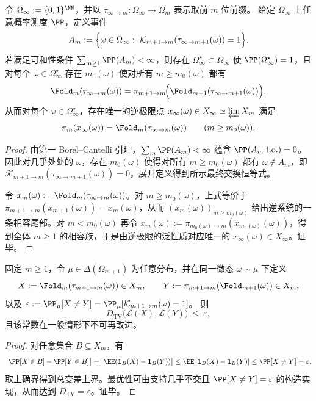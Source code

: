 \begin{theorem}[曲率事件可和性推出几乎处处的最终交换]\label{thm:pom-curvature-summable-eventual-commutation}
令 $\Omega_\infty:=\{0,1\}^{\NN}$，并以 $\tau_{\infty\to m}:\Omega_\infty\to\Omega_m$ 表示取前 $m$ 位前缀。
给定 $\Omega_\infty$ 上任意概率测度 $\PP$，定义事件
\[
A_m:=\Bigl\{\omega\in\Omega_\infty:\ \mathcal K_{m+1\to m}(\tau_{\infty\to m+1}(\omega))=1\Bigr\}.
\]
若满足可和性条件 $\sum_{m\ge 1}\PP(A_m)<\infty$，则存在 $\Omega_\infty^\star\subset\Omega_\infty$ 使 $\PP(\Omega_\infty^\star)=1$，且对每个 $\omega\in\Omega_\infty^\star$ 存在 $m_0(\omega)$ 使对所有 $m\ge m_0(\omega)$ 都有
\[
\Fold_m(\tau_{\infty\to m}(\omega))
=\pi_{m+1\to m}\!\Bigl(\Fold_{m+1}(\tau_{\infty\to m+1}(\omega))\Bigr).
\]
从而对每个 $\omega\in\Omega_\infty^\star$，存在唯一的逆极限点 $x_\infty(\omega)\in X_\infty\simeq\varprojlim X_m$ 满足
\[
\pi_m(x_\infty(\omega))=\Fold_m(\tau_{\infty\to m}(\omega))\qquad(m\ge m_0(\omega)).
\]
\end{theorem}
\begin{proof}
由第一 Borel--Cantelli 引理，$\sum_m\PP(A_m)<\infty$ 蕴含 $\PP(A_m\ \mathrm{i.o.})=0$。因此对几乎处处的 $\omega$，存在 $m_0(\omega)$ 使得对所有 $m\ge m_0(\omega)$ 都有 $\omega\notin A_m$，即 $\mathcal K_{m+1\to m}(\tau_{\infty\to m+1}(\omega))=0$，展开定义得到所示最终交换恒等式。

令 $x_m(\omega):=\Fold_m(\tau_{\infty\to m}(\omega))$。对 $m\ge m_0(\omega)$，上式等价于 $\pi_{m+1\to m}(x_{m+1}(\omega))=x_m(\omega)$，从而 $(x_m(\omega))_{m\ge m_0(\omega)}$ 给出逆系统的一条相容尾部。对 $m<m_0(\omega)$ 再令 $x_m(\omega):=\pi_{m_0(\omega)\to m}(x_{m_0(\omega)}(\omega))$，得到全体 $m\ge 1$ 的相容族，于是由逆极限的泛性质对应唯一的 $x_\infty(\omega)\in X_\infty$。证毕。
\end{proof}

\begin{proposition}[曲率概率给出的总变差最优上界]\label{prop:pom-curvature-tv-optimal}
固定 $m\ge 1$，令 $\mu\in\Delta(\Omega_{m+1})$ 为任意分布，并在同一微态 $\omega\sim\mu$ 下定义
\[
X:=\Fold_m(\tau_{m+1\to m}(\omega))\in X_m,
\qquad
Y:=\pi_{m+1\to m}(\Fold_{m+1}(\omega))\in X_m,
\]
以及 $\varepsilon:=\PP_\mu[X\neq Y]=\PP_\mu[\mathcal K_{m+1\to m}(\omega)=1]$。
则
\[
D_{\mathrm{TV}}\bigl(\mathcal L(X),\mathcal L(Y)\bigr)\ \le\ \varepsilon,
\]
且该常数在一般情形下不可再改进。
\end{proposition}
\begin{proof}
对任意集合 $B\subseteq X_m$，有
\[
\bigl|\PP[X\in B]-\PP[Y\in B]\bigr|
=\bigl|\EE(\mathbf 1_B(X)-\mathbf 1_B(Y))\bigr|
\le \EE\,|\mathbf 1_B(X)-\mathbf 1_B(Y)|
\le \PP[X\neq Y]=\varepsilon.
\]
取上确界得到总变差上界。最优性可由支持几乎不交且 $\PP[X\neq Y]=\varepsilon$ 的构造实现，从而达到 $D_{\mathrm{TV}}=\varepsilon$。证毕。
\end{proof}

